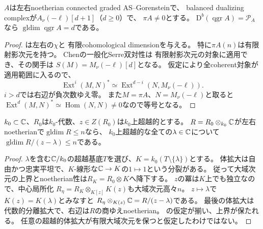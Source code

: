 \begin{lemma}[perfect性とSerre双対性からの正確な次元]
\label{CSBGlem:gluing-serre-dimension}
$A$は左右noetherian connected graded AS--Gorensteinで、
balanced dualizing complexが$A_\nu(-\ell)[d+1]$（$d\ge0$）で、
$\pi A\ne0$とする。
$\mathrm D^b(\operatorname{qgr}A)=\mathcal P_A$なら
$\operatorname{gldim}\operatorname{qgr}A=d$である。
\end{lemma}
\begin{proof}
\cite[Theorem~4.2, Corollary~4.3]{YZ}は左右の$\chi$と
有限cohomological dimensionを与える。
特に$\pi A(n)$は有限射影次元を持つ。
Chen\cite[Theorem~3.10]{CSBGChenGeneralizedSerre}の一般化Serre双対性は
有限射影次元の対象に適用でき、その関手は
$S(M)=M_\nu(-\ell)[d]$となる。
仮定により全coherent対象が適用範囲に入るので、
\[
 \operatorname{Ext}^i(M,N)^*
 \simeq\operatorname{Ext}^{d-i}(N,M_\nu(-\ell)).
\]
$i>d$では右辺が負次数ゆえ零。
また$M=\pi A$、$N=M_\nu(-\ell)$と取ると
$\operatorname{Ext}^d(M,N)^*\simeq\operatorname{Hom}(N,N)\ne0$なので等号となる。
\end{proof}

\begin{lemma}[超越的中心値の有限大域次元]
\label{CSBGlem:global-transcendental}
$k_0\subset\mathbb C$、$R_0$は$k_0$-代数、$z\in Z(R_0)$は$k_0$上超越的とする。
$R=R_0\otimes_{k_0}\mathbb C$が左右noetherianで$\operatorname{gldim}R\le n$なら、
$k_0$上超越的な全ての$\lambda\in\mathbb C$について
$\operatorname{gldim}R/(z-\lambda)\le n$である。
\end{lemma}
\begin{proof}
$\lambda$を含む$\mathbb C/k_0$の超越基底$T$を選び、$K=k_0(T\setminus\{\lambda\})$とする。
体拡大は自由かつ忠実平坦で、$K$-線形な$\mathbb C\to K$の$1\mapsto1$という分裂がある。
従って大域次元の上界とnoetherian性は$R_K=R_0\otimes K$へ降下する。
$z$の冪は$K$上でも独立なので、中心局所化
$R_\eta=R_K\otimes_{K[z]}K(z)$も大域次元高々$n$。
$z\mapsto\lambda$で$K(z)=K(\lambda)$とみなすと
$R_\eta\otimes_{K(z)}\mathbb C=R/(z-\lambda)$である。
最後の体拡大は代数的分離拡大で、右辺は$R$の商ゆえnoetherian。
\cite[Lemmas~3.2, 3.3]{RSVdB}の仮定が揃い、上界が保たれる。
任意の超越的体拡大が有限大域次元を保つと仮定したわけではない。
\end{proof}

